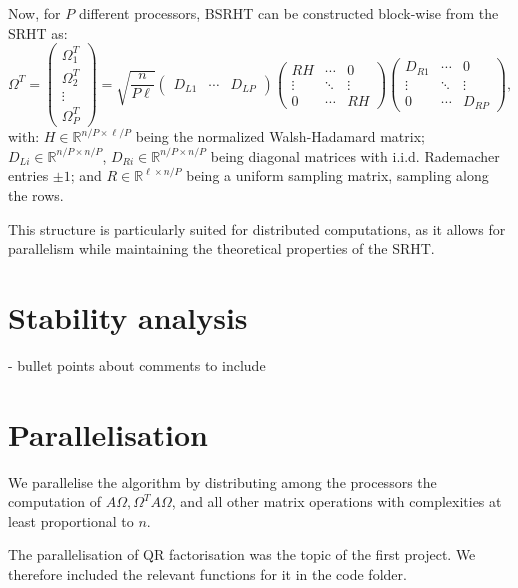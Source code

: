\documentclass[a4paper, 12pt,oneside]{article}
\begin{document}
Now, for $P$ different processors, BSRHT can be constructed block-wise from the SRHT as:
\[
\Omega^T = \begin{pmatrix} \Omega_1^T \\
\Omega_2^T \\
\vdots \\
\Omega_P^T \end{pmatrix} = \sqrt{\frac{n}{P\ell}} \begin{pmatrix} D_{L1} & \cdots & D_{LP} \end{pmatrix}
\begin{pmatrix}
RH & \cdots & 0 \\
\vdots & \ddots & \vdots \\
0 & \cdots & RH
\end{pmatrix}
\begin{pmatrix} D_{R1} & \cdots & 0 \\
\vdots & \ddots & \vdots \\
0 & \cdots & D_{RP} \end{pmatrix}, \tag{2}
\]
with: $H \in \mathbb{R}^{n/P \times \ell/P}$ being the normalized Walsh-Hadamard matrix; $D_{Li} \in \mathbb{R}^{n/P \times n/P}$, $D_{Ri} \in \mathbb{R}^{n/P \times n/P}$ being diagonal matrices with i.i.d. Rademacher entries $\pm 1$; and $R \in \mathbb{R}^{\ell \times n/P}$ being a uniform sampling matrix, sampling along the rows.

This structure is particularly suited for distributed computations, as it allows for parallelism while maintaining the theoretical properties of the SRHT.


	\section{Stability analysis}
		- bullet points about comments to include 
	\section{Parallelisation}
	We parallelise the algorithm by distributing among the processors the computation of $A \Omega,\Omega^T A \Omega$, and all other matrix operations with complexities at least proportional to $n$. 
	
	The parallelisation of QR factorisation was the topic of the first project. We therefore included the relevant functions for it in the code folder. 
	
\end{document}
